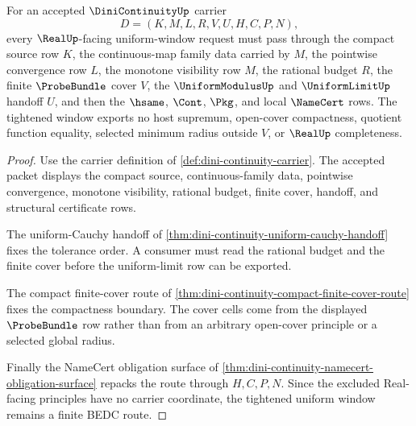 \begin{theorem}
\label{thm:dini-continuity-uniform-window-tightening}
For an accepted $\DiniContinuityUp$ carrier
$$
D=(K,M,L,R,V,U,H,C,P,N),
$$
every $\RealUp$-facing uniform-window request must pass through the compact source row $K$, the continuous-map family data carried by $M$, the pointwise convergence row $L$, the monotone visibility row $M$, the rational budget $R$, the finite $\ProbeBundle$ cover $V$, the $\UniformModulusUp$ and $\UniformLimitUp$ handoff $U$, and then the $\hsame$, $\Cont$, $\Pkg$, and local $\NameCert$ rows. The tightened window exports no host supremum, open-cover compactness, quotient function equality, selected minimum radius outside $V$, or $\RealUp$ completeness.
\end{theorem}
\begin{proof}
Use the carrier definition of \autoref{def:dini-continuity-carrier}. The accepted packet displays the compact source, continuous-family data, pointwise convergence, monotone visibility, rational budget, finite cover, handoff, and structural certificate rows.

The uniform-Cauchy handoff of \autoref{thm:dini-continuity-uniform-cauchy-handoff} fixes the tolerance order. A consumer must read the rational budget and the finite cover before the uniform-limit row can be exported.

The compact finite-cover route of \autoref{thm:dini-continuity-compact-finite-cover-route} fixes the compactness boundary. The cover cells come from the displayed $\ProbeBundle$ row rather than from an arbitrary open-cover principle or a selected global radius.

Finally the NameCert obligation surface of \autoref{thm:dini-continuity-namecert-obligation-surface} repacks the route through $H,C,P,N$. Since the excluded Real-facing principles have no carrier coordinate, the tightened uniform window remains a finite BEDC route.
\end{proof}


